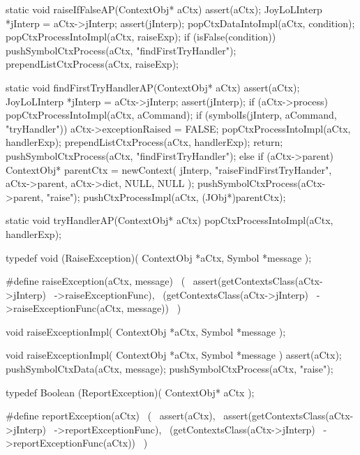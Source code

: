\startCCode
static void raiseIfFalseAP(ContextObj* aCtx) {
  assert(aCtx);
  JoyLoLInterp *jInterp = aCtx->jInterp;
  assert(jInterp);
  popCtxDataIntoImpl(aCtx, condition);
  popCtxProcessIntoImpl(aCtx, raiseExp);
  if (isFalse(condition)) {
    pushSymbolCtxProcess(aCtx, "findFirstTryHandler");
    prependListCtxProcess(aCtx, raiseExp);
  }
}
\stopCCode

\startCCode
static void findFirstTryHandlerAP(ContextObj* aCtx) {
  assert(aCtx);
  JoyLoLInterp *jInterp = aCtx->jInterp;
  assert(jInterp);
  if (aCtx->process) {
    popCtxProcessIntoImpl(aCtx, aCommand);
    if (symbolIs(jInterp, aCommand, "tryHandler")) {
      aCtx->exceptionRaised = FALSE;
      popCtxProcessIntoImpl(aCtx, handlerExp);
      prependListCtxProcess(aCtx, handlerExp);
      return;
    }
    pushSymbolCtxProcess(aCtx, "findFirstTryHandler");
  } else {
    if (aCtx->parent) {
      ContextObj* parentCtx = newContext(
        jInterp,
        "raiseFindFirstTryHander",
        aCtx->parent,
        aCtx->dict,
        NULL,
        NULL
      );
      pushSymbolCtxProcess(aCtx->parent, "raise");
      pushCtxProcessImpl(aCtx, (JObj*)parentCtx);
    }
  }
}
\stopCCode

\startCCode
static void tryHandlerAP(ContextObj* aCtx) {
  popCtxProcessIntoImpl(aCtx, handlerExp);
}
\stopCCode

\startCHeader
typedef void (RaiseException)(
  ContextObj *aCtx,
  Symbol     *message
);

#define raiseException(aCtx, message)       \
  (                                         \
    assert(getContextsClass(aCtx->jInterp)  \
      ->raiseExceptionFunc),                \
    (getContextsClass(aCtx->jInterp)        \
      ->raiseExceptionFunc(aCtx, message))  \
  )
\stopCHeader

\setCHeaderStream{private}
\startCHeader
void raiseExceptionImpl(
  ContextObj *aCtx,
  Symbol     *message
);
\stopCHeader
{}

\startCCode
void raiseExceptionImpl(
  ContextObj *aCtx,
  Symbol     *message
) {
  assert(aCtx);
  pushSymbolCtxData(aCtx, message);
  pushSymbolCtxProcess(aCtx, "raise");
}
\stopCCode

\startCHeader
typedef Boolean (ReportException)(
  ContextObj* aCtx
);

#define reportException(aCtx)               \
  (                                         \
    assert(aCtx),                           \
    assert(getContextsClass(aCtx->jInterp)  \
      ->reportExceptionFunc),               \
    (getContextsClass(aCtx->jInterp)        \
      ->reportExceptionFunc(aCtx))          \
  )
\stopCHeader

